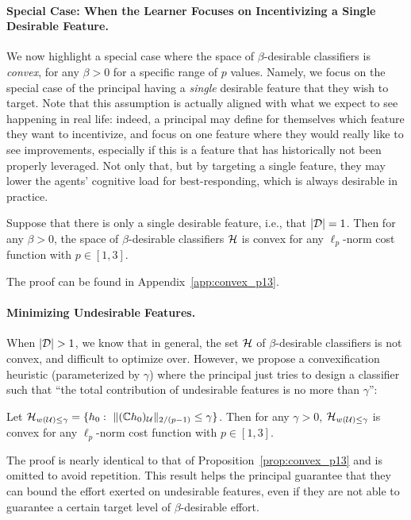 \paragraph{Special Case: When the Learner Focuses on Incentivizing a Single Desirable Feature.} We now highlight a special case where the space of $\beta$-desirable classifiers is \textit{convex}, for any $\beta > 0$ for a specific range of $p$ values. Namely, we focus on the special case of the principal having a \emph{single} desirable feature that they wish to target. Note that this assumption is actually aligned with what we expect to see happening in real life: indeed, a principal may define for themselves which feature they want to incentivize, and focus on one feature where they would really like to see improvements, especially if this is a feature that has historically not been properly leveraged. Not only that, but by targeting a single feature, they may lower the agents' cognitive load for best-responding, which is always desirable in practice. 

\begin{prop}\label{prop:convex_p13}
Suppose that there is only a single desirable feature, i.e., that $|\mathcal{D}| = 1$. Then for any $\beta > 0$, the space of $\beta$-desirable classifiers $\mathcal{H}$ is convex for any $\ell_p$-norm cost function with $p \in [1, 3]$.
\end{prop}


The proof can be found in Appendix~\ref{app:convex_p13}.


\paragraph{Minimizing Undesirable Features.}  When $|\mathcal{D}| > 1$, we know that in general, the set $\mathcal{H}$ of $\beta$-desirable classifiers is not convex, and difficult to optimize over. However, we propose a convexification heuristic (parameterized by $\gamma$) where the principal just tries to design a classifier such that ``the total contribution of undesirable features is no more than $\gamma$'':

\begin{prop}\label{prop:convex_relax}
Let $\mathcal{H}_{w(\mathcal{U}) \leq \gamma} = \{h_0:~ \| (\mathbb{C} h_0)_{\mathcal{U}}\|_{2/(p-1)} \leq \gamma\}$. Then for any $\gamma > 0$, $\mathcal{H}_{w(\mathcal{U}) \leq \gamma}$ is convex for any $\ell_p$-norm cost function with $p \in [1, 3]$.
\end{prop}


The proof is nearly identical to that of Proposition~\ref{prop:convex_p13} and is omitted to avoid repetition. This result helps the principal guarantee that they can bound the effort exerted on undesirable features, even if they are not able to guarantee a certain target level of $\beta$-desirable effort.











  


    






